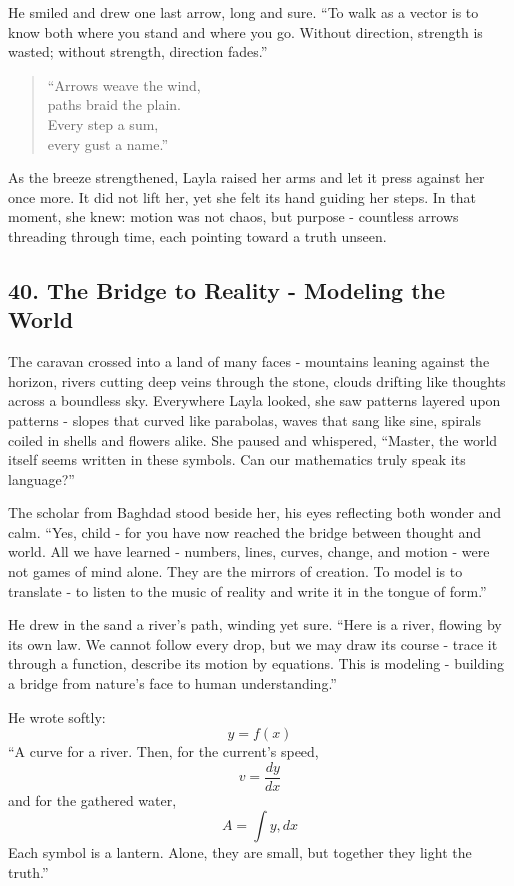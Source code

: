 \documentclass[
  letterpaper,
  DIV=11,
  numbers=noendperiod]{scrreprt}
\begin{document}
He smiled and drew one last arrow, long and sure. ``To walk as a vector
is to know both where you stand and where you go. Without direction,
strength is wasted; without strength, direction fades.''

\begin{quote}
``Arrows weave the wind,\\
paths braid the plain.\\
Every step a sum,\\
every gust a name.''
\end{quote}

As the breeze strengthened, Layla raised her arms and let it press
against her once more. It did not lift her, yet she felt its hand
guiding her steps. In that moment, she knew: motion was not chaos, but
purpose - countless arrows threading through time, each pointing toward
a truth unseen.

\subsection{40. The Bridge to Reality - Modeling the
World}\label{the-bridge-to-reality---modeling-the-world}

The caravan crossed into a land of many faces - mountains leaning
against the horizon, rivers cutting deep veins through the stone, clouds
drifting like thoughts across a boundless sky. Everywhere Layla looked,
she saw patterns layered upon patterns - slopes that curved like
parabolas, waves that sang like sine, spirals coiled in shells and
flowers alike. She paused and whispered, ``Master, the world itself
seems written in these symbols. Can our mathematics truly speak its
language?''

The scholar from Baghdad stood beside her, his eyes reflecting both
wonder and calm. ``Yes, child - for you have now reached the bridge
between thought and world. All we have learned - numbers, lines, curves,
change, and motion - were not games of mind alone. They are the mirrors
of creation. To model is to translate - to listen to the music of
reality and write it in the tongue of form.''

He drew in the sand a river's path, winding yet sure. ``Here is a river,
flowing by its own law. We cannot follow every drop, but we may draw its
course - trace it through a function, describe its motion by equations.
This is modeling - building a bridge from nature's face to human
understanding.''

He wrote softly: \[
y = f(x)
\] ``A curve for a river. Then, for the current's speed, \[
v = \frac{dy}{dx}
\] and for the gathered water, \[
A = \int y,dx
\] Each symbol is a lantern. Alone, they are small, but together they
light the truth.''
\end{document}
